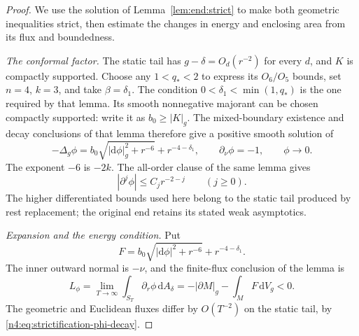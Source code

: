 \begin{proof}
We use the solution of Lemma~\ref{lem:end:strict} to make both geometric
inequalities strict, then estimate the changes in energy and enclosing
area from its flux and boundedness.

\smallskip
\noindent\emph{The conformal factor.} The static tail has
$g-\delta=O_d(r^{-2})$ for every $d$, and $K$ is compactly supported.
Choose any $1<q_*<2$ to express its $O_6/O_5$ bounds, set $n=4$,
$k=3$, and take $\beta=\delta_1$. The condition
$0<\delta_1<\min(1,q_*)$ is the one required by that lemma.
Its smooth nonnegative majorant can be chosen compactly supported:
write it as $b_0\ge|K|_g$. The mixed-boundary existence and decay
conclusions of that lemma therefore give a positive smooth solution of
\begin{equation}\label{n4:eq:strictification-pde}
 -\Delta_g\phi=b_0\sqrt{|\mathrm d\phi|_g^2+r^{-6}}+r^{-4-\delta_1},
 \qquad \partial_\nu\phi=-1,\qquad \phi\longrightarrow0.
\end{equation}
The exponent $-6$ is $-2k$. The all-order clause of the same lemma
gives
\begin{equation}\label{n4:eq:strictification-phi-decay}
 |\partial^j\phi|\le C_jr^{-2-j}\qquad(j\ge0).
\end{equation}
The higher differentiated bounds used here belong to the static tail
produced by rest replacement; the original end retains its stated weak
asymptotics.

\smallskip
\noindent\emph{Expansion and the energy condition.} Put
\[F=b_0\sqrt{|\mathrm d\phi|^2+r^{-6}}+r^{-4-\delta_1}.\]
The inner outward normal is $-\nu$, and the finite-flux conclusion of the lemma is
\begin{equation}\label{n4:eq:strictification-flux}
 L_\phi=\lim_{T\to\infty}\int_{S_T}\partial_r\phi\,\mathrm dA_\delta
       =-|\partial M|_g-\int_MF\,\mathrm dV_g<0.
\end{equation}
The geometric and Euclidean fluxes differ by $O(T^{-2})$ on the static
tail, by \eqref{n4:eq:strictification-phi-decay}.


\end{proof}
